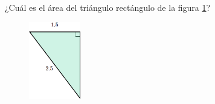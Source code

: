 ¿Cuál es el área del triángulo rectángulo de la figura \ref{fig:area_rectangulo_01}?
\begin{figure}[H]
    \begin{center}
        \includegraphics[width=0.2\textwidth]{../images/area_rectangulo_01.png}
    \end{center}
    \caption{}
    \label{fig:area_rectangulo_01}
\end{figure}